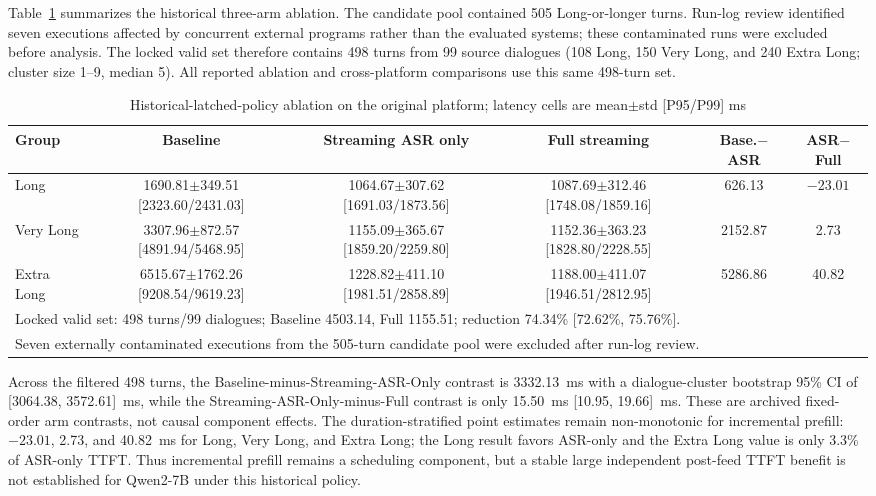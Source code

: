 \documentclass[conference]{IEEEtran}
\begin{document}
Table~\ref{tab:ablation} summarizes the historical three-arm ablation. The candidate pool contained 505 Long-or-longer turns. Run-log review identified seven executions affected by concurrent external programs rather than the evaluated systems; these contaminated runs were excluded before analysis. The locked valid set therefore contains 498 turns from 99 source dialogues (108 Long, 150 Very Long, and 240 Extra Long; cluster size 1--9, median 5). All reported ablation and cross-platform comparisons use this same 498-turn set.

\begin{table}[!t]
\caption{Historical-latched-policy ablation on the original platform; latency cells are mean$\pm$std [P95/P99] ms}\label{tab:ablation}
\centering
\scriptsize
\setlength{\tabcolsep}{3pt}
\begin{tabular}{@{}lccc cc@{}}
\toprule
Group & Baseline & Streaming ASR only & Full streaming & Base.$-$ASR & ASR$-$Full \\
\midrule
Long & 1690.81$\pm$349.51 [2323.60/2431.03] & 1064.67$\pm$307.62 [1691.03/1873.56] & 1087.69$\pm$312.46 [1748.08/1859.16] & 626.13 & $-23.01$ \\
Very Long & 3307.96$\pm$872.57 [4891.94/5468.95] & 1155.09$\pm$365.67 [1859.20/2259.80] & 1152.36$\pm$363.23 [1828.80/2228.55] & 2152.87 & 2.73 \\
Extra Long & 6515.67$\pm$1762.26 [9208.54/9619.23] & 1228.82$\pm$411.10 [1981.51/2858.89] & 1188.00$\pm$411.07 [1946.51/2812.95] & 5286.86 & 40.82 \\
\midrule
\multicolumn{6}{l}{\footnotesize Locked valid set: 498 turns/99 dialogues; Baseline 4503.14, Full 1155.51; reduction 74.34\% [72.62\%, 75.76\%].}\\
\multicolumn{6}{l}{\footnotesize Seven externally contaminated executions from the 505-turn candidate pool were excluded after run-log review.}\\
\bottomrule
\end{tabular}
\end{table}

Across the filtered 498 turns, the Baseline-minus-Streaming-ASR-Only contrast is 3332.13~ms with a dialogue-cluster bootstrap 95\% CI of [3064.38, 3572.61]~ms, while the Streaming-ASR-Only-minus-Full contrast is only 15.50~ms [10.95, 19.66]~ms. These are archived fixed-order arm contrasts, not causal component effects. The duration-stratified point estimates remain non-monotonic for incremental prefill: $-23.01$, 2.73, and 40.82~ms for Long, Very Long, and Extra Long; the Long result favors ASR-only and the Extra Long value is only 3.3\% of ASR-only TTFT. Thus incremental prefill remains a scheduling component, but a stable large independent post-feed TTFT benefit is not established for Qwen2-7B under this historical policy.
\end{document}

